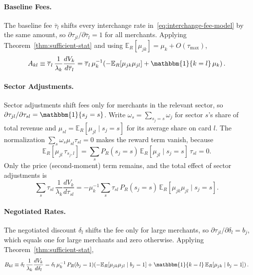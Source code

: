\documentclass[main.tex]{subfiles}
\begin{document}
\paragraph{Baseline Fees.}
The baseline fee $\overline{\tau}_l$ shifts every interchange rate in~\eqref{eq:interchange-fee-model} by the same amount, so $\partial\tau_{jl}/\partial\overline{\tau}_l=1$ for all merchants.
Applying Theorem~\ref{thm:sufficient-stat} and using $\mathbb{E}_R[\mu_{jk}]=\mu_k+O(\tau_{\max})$,
\[
A_{kl}\equiv\overline{\tau}_l\,\frac{1}{\lambda_k}\frac{dV_k}{d\overline{\tau}_l}=\overline{\tau}_l\,\mu_k^{-1}\!\left(-\mathbb{E}_R[\mu_{jk}\mu_{jl}]+\mathbbm{1}\{k=l\}\,\mu_k\right).
\]

\paragraph{Sector Adjustments.}
Sector adjustments shift fees only for merchants in the relevant sector, so $\partial\tau_{jl}/\partial\tau_{sl}=\mathbbm{1}\{s_j=s\}$.
Write $\omega_s=\sum_{s_j=s}\omega_j$ for sector $s$'s share of total revenue and $\mu_{sl}=\mathbb{E}_R[\mu_{jl}\mid s_j=s]$ for its average share on card $l$.
The normalization $\sum_s\omega_s\mu_{sl}\tau_{sl}=0$ makes the reward term vanish, because
\[
\mathbb{E}_R[\mu_{jl}\,\tau_{s_j,l}]=\sum_s P_R(s_j=s)\,\mathbb{E}_R[\mu_{jl}\mid s_j=s]\,\tau_{sl}=0.
\]
Only the price (second-moment) term remains, and the total effect of sector adjustments is
\[
\sum_s\tau_{sl}\,\frac{1}{\lambda_k}\frac{dV_k}{d\tau_{sl}}=-\mu_k^{-1}\sum_s\tau_{sl}\,P_R(s_j=s)\,\mathbb{E}_R[\mu_{jk}\mu_{jl}\mid s_j=s].
\]

\paragraph{Negotiated Rates.}
The negotiated discount $\delta_l$ shifts the fee only for large merchants, so $\partial\tau_{jl}/\partial\delta_l=b_j$, which equals one for large merchants and zero otherwise.
Applying Theorem~\ref{thm:sufficient-stat},
\[
B_{kl}\equiv\delta_l\,\frac{1}{\lambda_k}\frac{dV_k}{d\delta_l}=\delta_l\,\mu_k^{-1}\,P_R(b_j=1)\!\left(-\mathbb{E}_R[\mu_{jk}\mu_{jl}\mid b_j=1]+\mathbbm{1}\{k=l\}\,\mathbb{E}_R[\mu_{jk}\mid b_j=1]\right).
\]
\end{document}
